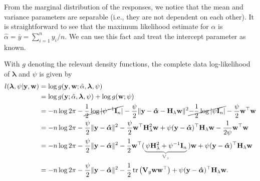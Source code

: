 From the marginal distribution of the responses, we notice that the mean and variance parameters are separable (i.e., they are not dependent on each other). It is straightforward to see that the maximum likelihood estimate for $\alpha$ is $\hat\alpha = \bar y = \sum_{i=1}^n y_i / n$. We can use this fact and treat the intercept parameter as known.

With $g$ denoting the relevant density functions, the complete data log-likelihood of $\boldsymbol\lambda$ and $\psi$ is given by
\begin{align*}
	l(\boldsymbol{\lambda}, \psi|\mathbf y, \bw)
	&= \log g(\mathbf y, \bw; \hat\alpha, \boldsymbol{\lambda}, \psi) \\
	&= \log g(\mathbf y; \hat\alpha, \boldsymbol{\lambda}, \psi) + \log g(\bw; \psi)  \\
	&= - n \log 2\pi - \cancel{\half\log|\psi^{-1}\mathbf I_n|} - \frac{\psi}{2} \Vert \mathbf y - \boldsymbol{\hat\alpha} - \mathbf H_\lambda\bw \Vert^2 \cancel{ - \half\log|\psi\mathbf I_n|} - \frac{\psi}{2}\bw ^\top \bw  \\
	&= - n \log 2\pi - \frac{\psi}{2} \Vert \mathbf y - \boldsymbol{\hat\alpha} \Vert^2 - \frac{\psi}{2}\bw^\top\mathbf H_\lambda^2\bw + \psi(\mathbf y - \boldsymbol{\hat\alpha})^\top \mathbf H_\lambda\bw -\frac{1}{2\psi} \bw ^\top \bw  \\
	&= - n \log 2\pi - \frac{\psi}{2} \Vert \mathbf y - \boldsymbol{\hat\alpha} \Vert^2 - \half\bw^\top( {\color{gray} \underbrace{{\color{black} \, \psi\mathbf H_\lambda^2 + \psi^{-1}\mathbf I_n}}_{\mathbf V_y} \, } )\bw + \psi(\mathbf y - \boldsymbol{\hat\alpha})^\top \mathbf H_\lambda\bw \\
	&= - n \log 2\pi - \frac{\psi}{2} \Vert \mathbf y - \boldsymbol{\hat\alpha} \Vert^2 - \half \tr \left( \mathbf V_y  \bw \bw^\top \right) + \psi(\mathbf y - \boldsymbol{\hat\alpha})^\top \mathbf H_\lambda\bw.
\end{align*}

